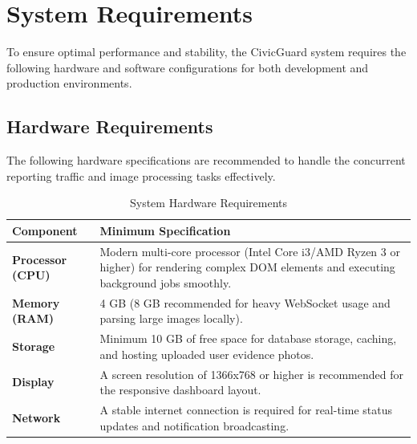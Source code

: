 \section{System Requirements}
To ensure optimal performance and stability, the CivicGuard system requires the following hardware and software configurations for both development and production environments.

\subsection{Hardware Requirements}
The following hardware specifications are recommended to handle the concurrent reporting traffic and image processing tasks effectively.
\begin{table}[H]
\centering
\renewcommand{\arraystretch}{1.5}
\begin{tabular}{|p{4cm}|p{10cm}|}
\hline
\textbf{Component} & \textbf{Minimum Specification} \\ \hline
\textbf{Processor (CPU)} & Modern multi-core processor (Intel Core i3/AMD Ryzen 3 or higher) for rendering complex DOM elements and executing background jobs smoothly. \\ \hline
\textbf{Memory (RAM)} & 4 GB (8 GB recommended for heavy WebSocket usage and parsing large images locally). \\ \hline
\textbf{Storage} & Minimum 10 GB of free space for database storage, caching, and hosting uploaded user evidence photos. \\ \hline
\textbf{Display} & A screen resolution of 1366x768 or higher is recommended for the responsive dashboard layout. \\ \hline
\textbf{Network} & A stable internet connection is required for real-time status updates and notification broadcasting. \\ \hline
\end{tabular}
\caption{System Hardware Requirements}
\label{tab:hw_req}
\end{table}

